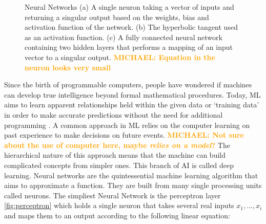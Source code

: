 \documentclass[12pt]{iopart}
\newcommand{\michael}[1]{\textbf{\textcolor{orange}{MICHAEL: #1}}}
\begin{document}
\begin{figure}
\begin{minipage}[b]{0.7\linewidth}
    \end{minipage}
    \caption{Neural Networks (a) A single neuron taking a vector of inputs and returning a singular output based on the weights, bias and activation function of the network. (b) The hyperbolic tangent used as an activation function. (c) A fully connected neural network containing two hidden layers that performs a mapping of an input vector to a singular output. \michael{Equation in the neuron looks very small}}
\end{figure}

Since the birth of programmable computers, people have wondered if machines can develop true intelligence beyond formal mathematical procedures. Today, ML aims to learn apparent relationships held within the given data or `training data' in order to make accurate predictions without the need for additional programming . A common approach in ML relies on the computer learning on past experience to make decisions on future events. \michael{Not sure about the use of computer here, maybe
\textit{relies on a model}?} The hierarchical nature of this approach means that the machine can build complicated concepts from simpler ones. This branch of AI is called deep learning.
Neural networks are the quintessential machine learning algorithm that aims to approximate a function. They are built from many single processing units called neurons. The simpliest Neural Network is the perceptron layer \cref{fig:perceptron} which holds a single neuron that takes several real inputs $x_{1}, ... , x_{i}$ and maps them to an output according to the following linear equation: 
\end{document}
